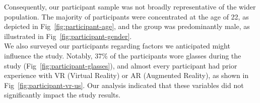 Consequently, our participant sample was not broadly representative of the wider population. The majority of participants were concentrated at the age of 22, as depicted in Fig~\ref{fig:participant-age}, and the group was predominantly male, as illustrated in Fig~\ref{fig:participant-gender}. \\

We also surveyed our participants regarding factors we anticipated might influence the study. Notably, 37\% of the participants wore glasses during the study (Fig~\ref{fig:participant-glasses}), and almost every participant had prior experience with VR (Virtual Reality) or AR (Augmented Reality), as shown in Fig~\ref{fig:participant-vr-us}. Our analysis indicated that these variables did not significantly impact the study results.

\begin{invisBox}
	\hfill
\end{invisBox}
